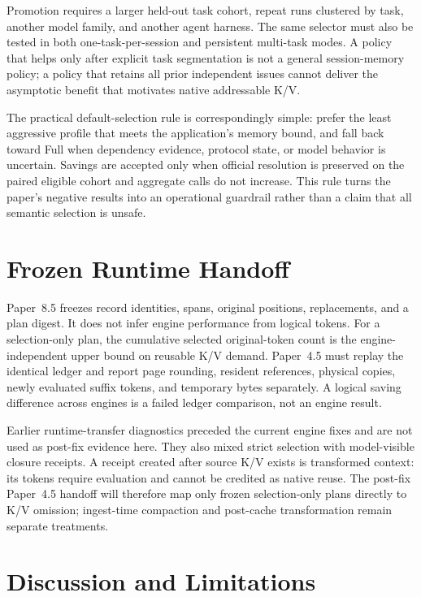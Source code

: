 \documentclass[11pt]{article}
\begin{document}
Promotion requires a larger held-out task cohort, repeat runs clustered by task,
another model family, and another agent harness.  The same selector must also be
tested in both one-task-per-session and persistent multi-task modes.  A policy
that helps only after explicit task segmentation is not a general session-memory
policy; a policy that retains all prior independent issues cannot deliver the
asymptotic benefit that motivates native addressable K/V.

The practical default-selection rule is correspondingly simple: prefer the
least aggressive profile that meets the application's memory bound, and fall
back toward Full when dependency evidence, protocol state, or model behavior is
uncertain.  Savings are accepted only when official resolution is preserved on
the paired eligible cohort and aggregate calls do not increase.  This rule
turns the paper's negative results into an operational guardrail rather than a
claim that all semantic selection is unsafe.

\section{Frozen Runtime Handoff}

Paper~8.5 freezes record identities, spans, original positions, replacements,
and a plan digest.  It does not infer engine performance from logical tokens.
For a selection-only plan, the cumulative selected original-token count is the
engine-independent upper bound on reusable K/V demand.  Paper~4.5 must replay
the identical ledger and report page rounding, resident references, physical
copies, newly evaluated suffix tokens, and temporary bytes separately.  A
logical saving difference across engines is a failed ledger comparison, not an
engine result.

Earlier runtime-transfer diagnostics preceded the current engine fixes and are
not used as post-fix evidence here.  They also mixed strict selection with
model-visible closure receipts.  A receipt created after source K/V exists is
transformed context: its tokens require evaluation and cannot be credited as
native reuse.  The post-fix Paper~4.5 handoff will therefore map only frozen
selection-only plans directly to K/V omission; ingest-time compaction and
post-cache transformation remain separate treatments.

\section{Discussion and Limitations}
\end{document}
